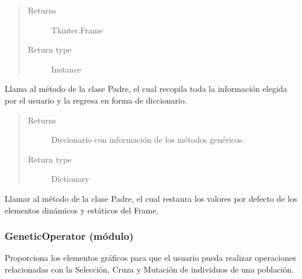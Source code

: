 \documentclass[letterpaper,10pt,english]{sphinxmanual}
\begin{document}
\begin{fulllineitems}
\begin{quote}
\begin{description}
\item[{Returns}] \leavevmode
Tkinter.Frame

\item[{Return type}] \leavevmode
Instance

\end{description}\end{quote}

\begin{fulllineitems}
\label{View/Main/Population/TemplatePopulation/FitnessFrame:View.Main.Population.FitnessFrame.FitnessFrame.get_information}
Llama al método de la clase Padre, el cual recopila toda la información
elegida por el usuario y la regresa en forma de diccionario.
\begin{quote}\begin{description}
\item[{Returns}] \leavevmode
Diccionario con información de los métodos genéricos.

\item[{Return type}] \leavevmode
Dictionary

\end{description}\end{quote}

\end{fulllineitems}


\begin{fulllineitems}
\label{View/Main/Population/TemplatePopulation/FitnessFrame:View.Main.Population.FitnessFrame.FitnessFrame.restore_settings}
Llamar al método de la clase Padre, el cual restaura los valores por 
defecto de los elementos dinámicos y estáticos del Frame.

\end{fulllineitems}


\end{fulllineitems}



\subsubsection{GeneticOperator (módulo)}
\label{View/Main/GeneticOperator/GeneticOperator:geneticoperator-modulo}\label{View/Main/GeneticOperator/GeneticOperator::doc}
Proporciona los elementos gráficos para que el usuario pueda
realizar operaciones relacionadas con la Selección, Cruza y Mutación de
individuos de una población.
\end{document}
